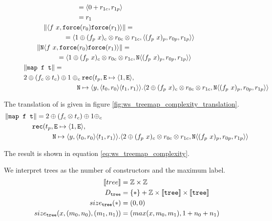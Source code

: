 \begin{figure}
\begin{equation*}
\begin{split}
      &\qquad\quad\quad\quad\quad\quad\quad = \langle 0 + r_{1c}, r_{1p} \rangle \\
      &\qquad\quad\quad\quad\quad\quad\quad = r_1  \\
      &\qquad\quad \|\langle f\ x, \texttt{force}(r_0) \texttt{force}(r_1)\rangle \| = \\
      &\qquad\quad\quad\quad\quad = \langle 1 \oplus (f_p\ x)_c \otimes r_{0c} \otimes r_{1c}, \langle (f_p\ x)_p, r_{0p}, r_{1p}\rangle\rangle \\
      &\qquad \|\texttt{N}\langle f\ x, \texttt{force}(r_0) \texttt{force}(r_1)\rangle \| = \\
      &\qquad\quad\quad\quad = \langle 1 \oplus (f_p\ x)_c \otimes r_{0c} \otimes r_{1c}, \texttt{N} \langle (f_p\ x)_p, r_{0p}, r_{1p}\rangle\rangle \\
      &\|\texttt{map f t}\| = \\
      &2 \oplus (f_c \otimes t_c) \oplus 1 \oplus_c \texttt{rec}(t_p, \texttt{E} \mapsto \langle 1, \texttt{E}\rangle, \\
      &\qquad\quad\quad\quad\quad\quad\quad \texttt{N} \mapsto \langle y, \langle t_0, r_0 \rangle \langle t_1, r_1 \rangle \rangle.  \langle 2 \oplus (f_p\ x)_c \otimes r_{0c} \otimes r_{1c}, \texttt{N} \langle (f_p\ x)_p, r_{0p}, r_{1p}\rangle\rangle
    \end{split}
  \end{equation*}
\end{figure}

The translation of  is given in figure \ref{fig:ws_treemap_complexity_translation}.
\begin{equation}
  \label{eq:ws_treemap_complexity}
  \begin{split}
    &\|\texttt{map f t}\| = 2 \oplus (f_c \otimes t_c) \oplus 1 \oplus_c \\
    &\qquad\quad\quad \texttt{rec}(t_p, \texttt{E} \mapsto \langle 1, \texttt{E}\rangle, \\
    &\qquad\quad\quad\quad\quad\quad \texttt{N} \mapsto \langle y, \langle t_0, r_0 \rangle \langle t_1, r_1 \rangle \rangle.  \langle 2 \oplus (f_p\ x)_c \otimes r_{0c} \otimes r_{1c}, \texttt{N} \langle (f_p\ x)_p, r_{0p}, r_{1p}\rangle\rangle
\end{split}
\end{equation}

The result is shown in equation \ref{eq:ws_treemap_complexity}.

We interpret trees as the number of  constructors and the maximum label.
\begin{align*}
  \llbracket tree \rrbracket &= \mathbb{Z} \times \mathbb{Z} \\
  D_{\texttt{tree}} &= \{\ast\} + \mathbb{Z} \times \llbracket \texttt{tree} \rrbracket \times \llbracket \texttt{tree} \rrbracket \\
  size_{\texttt{tree}}(\ast) &= (0, 0) \\
  size_{\texttt{tree}}(x, (m_0, n_0), (m_1, n_1)) &= (max(x, m_0, m_1), 1 + n_0 + n_1)
\end{align*}

